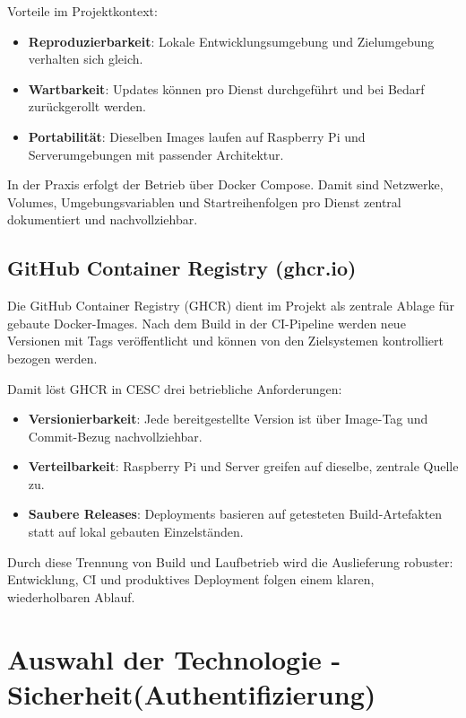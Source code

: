 Vorteile im Projektkontext:

\begin{itemize}
    \item \textbf{Reproduzierbarkeit}: Lokale Entwicklungsumgebung und Zielumgebung verhalten sich gleich.
    \item \textbf{Wartbarkeit}: Updates können pro Dienst durchgeführt und bei Bedarf zurückgerollt werden.
    \item \textbf{Portabilität}: Dieselben Images laufen auf Raspberry Pi und Serverumgebungen mit passender Architektur.
\end{itemize}

In der Praxis erfolgt der Betrieb über Docker Compose. Damit sind Netzwerke, Volumes, Umgebungsvariablen und Startreihenfolgen pro Dienst zentral dokumentiert und nachvollziehbar.

\subsection{GitHub Container Registry (ghcr.io)}

Die GitHub Container Registry (GHCR) dient im Projekt als zentrale Ablage für gebaute Docker-Images. Nach dem Build in der CI-Pipeline werden neue Versionen mit Tags veröffentlicht und können von den Zielsystemen kontrolliert bezogen werden.

Damit löst GHCR in CESC drei betriebliche Anforderungen:

\begin{itemize}
    \item \textbf{Versionierbarkeit}: Jede bereitgestellte Version ist über Image-Tag und Commit-Bezug nachvollziehbar.
    \item \textbf{Verteilbarkeit}: Raspberry Pi und Server greifen auf dieselbe, zentrale Quelle zu.
    \item \textbf{Saubere Releases}: Deployments basieren auf getesteten Build-Artefakten statt auf lokal gebauten Einzelständen.
\end{itemize}

Durch diese Trennung von Build und Laufbetrieb wird die Auslieferung robuster: Entwicklung, CI und produktives Deployment folgen einem klaren, wiederholbaren Ablauf.

\section{Auswahl der Technologie - Sicherheit(Authentifizierung)}

